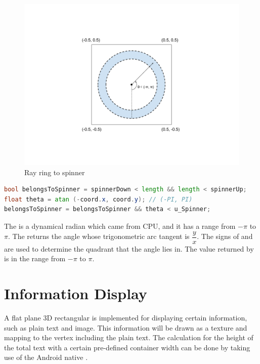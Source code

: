 \begin{figure}[H]
\caption{Ray ring to spinner}
\label{fig:ray-ring2spinner}
\centering
\includegraphics[width=\textwidth, keepaspectratio]{Figures/ray-ring2spinner.png}
\decoRule
\end{figure}

\begin{lstlisting}[language=Glsl]
bool belongsToSpinner = spinnerDown < length && length < spinnerUp;
float theta = atan (-coord.x, coord.y); // (-PI, PI)
belongsToSpinner = belongsToSpinner && theta < u_Spinner;
\end{lstlisting}

The  is a dynamical radian which came from CPU, and it has a range from $-\pi$ to $\pi$. The  returns the angle whose trigonometric arc tangent is $\dfrac{y}{x}$. The signs of  and  are used to determine the quadrant that the angle lies in. The value returned by  is in the range from $-\pi$ to $\pi$.

\section{Information Display}

A flat plane 3D rectangular  is implemented for displaying certain information, such as plain text and image. This information will be drawn as a texture and mapping to the  vertex including the plain text. The calculation for the height of the total text with a certain pre-defined container width can be done by taking use of the Android native . 

